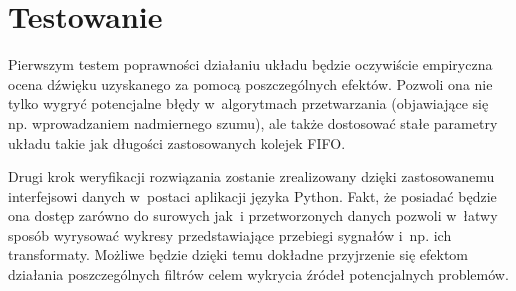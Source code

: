 
\section{Testowanie}

Pierwszym testem poprawności działaniu układu będzie oczywiście empiryczna ocena dźwięku uzyskanego za pomocą poszczególnych efektów. Pozwoli ona nie tylko wygryć potencjalne błędy w~algorytmach przetwarzania (objawiające się np. wprowadzaniem nadmiernego szumu), ale także dostosować stałe parametry układu takie jak długości zastosowanych kolejek FIFO. 

Drugi krok weryfikacji rozwiązania zostanie zrealizowany dzięki zastosowanemu interfejsowi danych w~postaci aplikacji języka Python. Fakt, że posiadać będzie ona dostęp zarówno do surowych jak~i przetworzonych danych pozwoli w~łatwy sposób wyrysować wykresy przedstawiające przebiegi sygnałów i~np. ich transformaty. Możliwe będzie dzięki temu dokładne przyjrzenie się efektom działania poszczególnych filtrów celem wykrycia źródeł potencjalnych problemów. 

